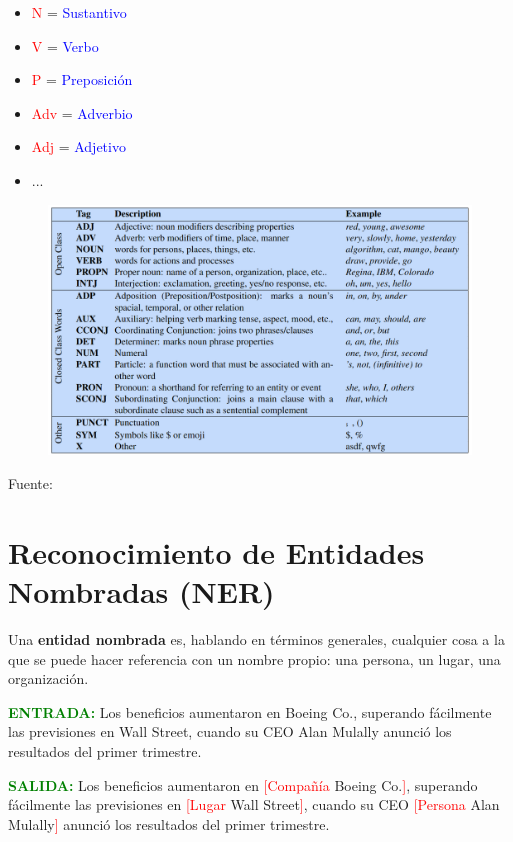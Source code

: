 \begin{itemize}
  \item \textcolor{red}{N} = \textcolor{blue}{Sustantivo}
  \item \textcolor{red}{V} = \textcolor{blue}{Verbo}
  \item \textcolor{red}{P} = \textcolor{blue}{Preposición}
  \item \textcolor{red}{Adv} = \textcolor{blue}{Adverbio}
  \item \textcolor{red}{Adj} = \textcolor{blue}{Adjetivo}
  \item ...
\end{itemize}

\begin{figure}[h]
  \includegraphics[scale=0.34]{pics/posTags.png}
\end{figure}
Fuente: \cite{JurafskyBook}

\section{Reconocimiento de Entidades Nombradas (NER)}
Una \textbf{entidad nombrada} es, hablando en términos generales, cualquier cosa a la que se puede hacer referencia con un nombre propio: una persona, un lugar, una organización. \vspace{0.5cm}

\textcolor{green}{\textbf{ENTRADA:}}
Los beneficios aumentaron en Boeing Co., superando fácilmente las previsiones en Wall Street, cuando su CEO Alan Mulally anunció los resultados del primer trimestre.  \vspace{0.5cm}

\textcolor{green}{\textbf{SALIDA:}}
Los beneficios aumentaron en \textcolor{red}{[Compañía} Boeing Co.\textcolor{red}{]}, superando fácilmente las previsiones en \textcolor{red}{[Lugar} Wall Street\textcolor{red}{]}, cuando su CEO \textcolor{red}{[Persona} Alan Mulally\textcolor{red}{]} anunció los resultados del primer trimestre. \vspace{0.5cm}


